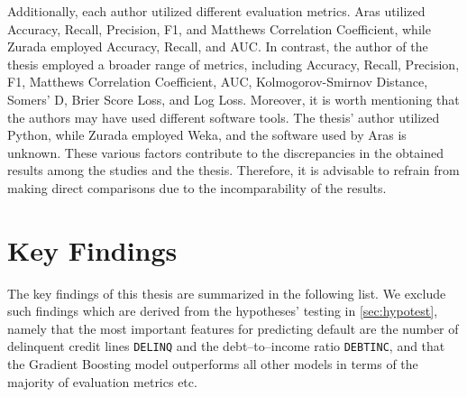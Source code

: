 Additionally, each author utilized different evaluation metrics. Aras utilized Accuracy, Recall, Precision, F1, and Matthews Correlation Coefficient, while Zurada employed Accuracy, Recall, and AUC.
In contrast, the author of the thesis employed a broader range of metrics, including Accuracy, Recall, Precision, F1, Matthews Correlation Coefficient, AUC, Kolmogorov-Smirnov Distance, Somers' D, Brier Score Loss, and Log Loss.
Moreover, it is worth mentioning that the authors may have used different software tools. The thesis' author utilized Python, while Zurada employed Weka, and the software used by Aras is unknown.
These various factors contribute to the discrepancies in the obtained results among the studies and the thesis. Therefore, it is advisable to refrain from making direct comparisons due to the incomparability of the results.
\vspace{0.3cm}

\newpage
\section{Key Findings}
\label{sec:keyfindings}
The key findings of this thesis are summarized in the following list. We exclude such findings which are derived from the hypotheses' testing in \autoref{sec:hypotest}, namely that the most important features for predicting default are the number of delinquent credit lines \texttt{DELINQ} and the debt--to--income ratio \texttt{DEBTINC}, and that the Gradient Boosting model outperforms all other models in terms of the majority of evaluation metrics etc.

